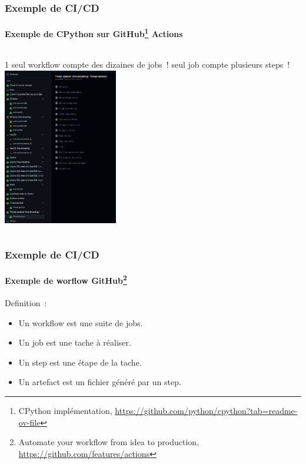 \documentclass{beamer}
\begin{document}
    \begin{frame}
        \frametitle{Exemple de CI/CD}
        \framesubtitle{Exemple de CPython sur GitHub{\footnote{CPython implémentation, \url{https://github.com/python/cpython?tab=readme-ov-file}}} Actions}
        \transdissolve
        \begin{columns}
            1 seul workflow compte des dizaines de jobs~!
             seul job compte plusieurs steps~!
            \centering
            \includegraphics[width=5cm]{image/cpython-workflow-jobs}
        \end{columns}
    \end{frame}

    \begin{frame}
        \frametitle{Exemple de CI/CD}
        \framesubtitle{Exemple de worflow GitHub{\footnote{Automate your workflow from idea to production, \url{https://github.com/features/actions}}}}
        \transdissolve

        Definition~:
        \begin{itemize}
            \item Un workflow est une suite de jobs.
            \item Un job est une tache à réaliser.
            \item Un step est une étape de la tache.
            \item Un artefact est un fichier généré par un step.
        \end{itemize}
    \end{frame}
\end{document}
